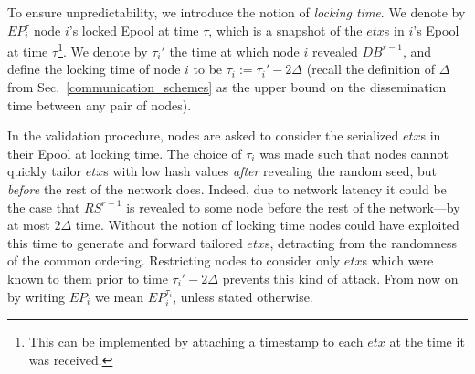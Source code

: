 
To ensure unpredictability, we introduce the notion of \textit{locking time}. We denote by $EP_i^\tau$ node $i$'s locked Epool at time $\tau$, which is a snapshot of the $etx$s in $i$'s Epool at time $\tau$\footnote{This can be implemented by attaching a timestamp to each $etx$ at the time it was received.}. We denote by $\tau_i'$ the time at which node $i$ revealed $DB^{r-1}$, and define the locking time of node $i$ to be $\tau_i:=\tau_i'-2\Delta$ (recall the definition of $\Delta$ from Sec.~\ref{communication_schemes} as the upper bound on the dissemination time between any pair of nodes).

In the validation procedure, nodes are asked to consider the serialized $etx$s in their Epool at locking time. The choice of $\tau_i$ was made such that nodes cannot quickly tailor $etx$s with low hash values \emph{after} revealing the random seed, but \emph{before} the rest of the network does.  Indeed, due to network latency it could be the case that $RS^{r-1}$ is revealed to some node before the rest of the network---by at most $2\Delta$ time. Without the notion of locking time nodes could have exploited this time to generate and forward tailored $etx$s, detracting from the randomness of the common ordering. Restricting nodes to consider only $etx$s which were known to them prior to time $\tau_i'-2\Delta$ prevents this kind of attack. From now on by writing $EP_i$ we mean $EP_i^{\tau_i}$, unless stated otherwise.



